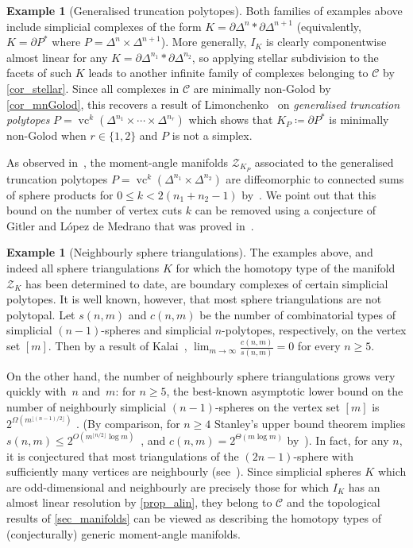 \documentclass[a4paper,10pt]{amsart}
\theoremstyle{definition}
\newtheorem{example}[theorem]{Example}
\theoremstyle{remark}
\begin{document}
\begin{example}[Generalised truncation polytopes] 
Both families of examples above include simplicial complexes of the form $K=\partial\Delta^n * \partial\Delta^{n+1}$ (equivalently, $K=\partial P^*$ where $P=\Delta^n\times\Delta^{n+1}$). More generally, $I_K$ is clearly componentwise almost linear for any $K=\partial\Delta^{n_1}*\partial\Delta^{n_2}$, so applying stellar subdivision to the facets of such $K$ leads to another infinite family of complexes belonging to $\mathcal{C}$ by \cref{cor_stellar}. Since all complexes in $\mathcal{C}$ are minimally non-Golod by \cref{cor_mnGolod}, this recovers a result of Limonchenko~\cite[Theorem~3.2]{L} on \emph{generalised truncation polytopes} $P=\operatorname{vc}^k(\Delta^{n_1}\times\cdots\times\Delta^{n_r})$ which shows that $K_P\coloneqq \partial P^*$ is minimally non-Golod when $r\in \{1,2\}$ and $P$ is not a simplex. 

As observed in~\cite{L}, the moment-angle manifolds $\mathcal{Z}_{K_P}$ associated to the generalised truncation polytopes $P=\operatorname{vc}^k(\Delta^{n_1}\times\Delta^{n_2})$ are diffeomorphic to connected sums of sphere products for $0\leqslant k< 2(n_1+n_2-1)$ by~\cite[Theorem~2.2]{GL}. We point out that this bound on the number of vertex cuts $k$ can be removed using a conjecture of Gitler and L\'opez de Medrano that was proved in~\cite{CFW}.
\end{example}

\begin{example}[Neighbourly sphere triangulations] \label{ex_nbrly}
The examples above, and indeed all sphere triangulations $K$ for which the homotopy type of the manifold $\mathcal{Z}_K$ has been determined to date, are boundary complexes of certain simplicial polytopes. It is well known, however, that most sphere triangulations are not polytopal. Let $s(n,m)$ and $c(n,m)$ be the number of combinatorial types of simplicial $(n-1)$-spheres and simplicial $n$-polytopes, respectively, on the vertex set $[m]$. Then by a result of Kalai~\cite{K}, $\lim_{m\to\infty}\frac{c(n,m)}{s(n,m)} = 0$ for every $n\geqslant 5$.

On the other hand, the number of neighbourly sphere triangulations grows very quickly with~$n$ and~$m$: for $n\geqslant 5$, the best-known asymptotic lower bound on the number of neighbourly simplicial $(n-1)$-spheres on the vertex set $[m]$ is $2^{\Omega(m^{\lfloor (n-1)/2\rfloor})}$ \cite{NZ}. (By comparison, for $n\geqslant 4$ Stanley's upper bound theorem implies $s(n,m)\leqslant 2^{O(m^{\lfloor n/2\rfloor}\log m)}$~\cite[Section~4.2]{K}, and $c(n,m)=2^{\Theta(m\log m)}$ by~\cite{Al,GP}). In fact, for any $n$, it is conjectured that most triangulations of the $(2n-1)$-sphere with sufficiently many vertices are neighbourly (see~\cite[Section~6.3]{K}). Since simplicial spheres $K$ which are odd-dimensional and neighbourly are precisely those for which $I_K$ has an almost linear resolution by \cref{prop_alin}, they belong to $\mathcal{C}$ and the topological results of \cref{sec_manifolds} can be viewed as describing the homotopy types of (conjecturally) generic moment-angle manifolds.
\end{example}
\end{document}
